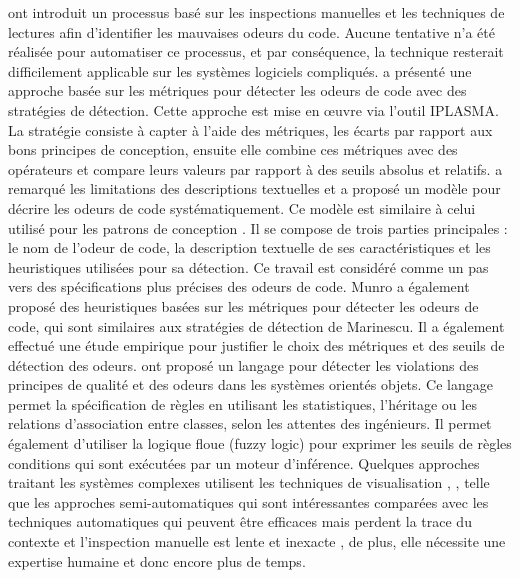 	\cite{travassos1999detecting} ont introduit un processus basé sur les inspections manuelles et les techniques de lectures afin d’identifier les mauvaises odeurs du code. Aucune tentative n'a été réalisée pour automatiser ce processus, et par conséquence, la technique resterait difficilement applicable sur les systèmes logiciels compliqués.
\cite{marinescu2004detection} a présenté une approche basée sur les métriques pour détecter les odeurs de code avec des stratégies de détection. Cette approche est mise en œuvre via l'outil IPLASMA. La stratégie consiste à capter à l'aide des métriques, les écarts par rapport aux bons principes de conception, ensuite elle combine ces métriques avec des opérateurs  et compare leurs valeurs par rapport à des seuils absolus et relatifs.
\cite{munro2005product} a remarqué les limitations des descriptions textuelles et a proposé un modèle pour décrire les odeurs de code systématiquement. Ce modèle est similaire à celui utilisé pour les patrons de conception \cite{vlissides1995design}. Il se compose de trois parties principales : le nom de l'odeur de code, la description textuelle de ses caractéristiques et les heuristiques utilisées pour sa détection.
\newline
Ce travail est considéré comme un pas vers des spécifications plus précises des odeurs de code. Munro a également proposé des heuristiques basées sur les métriques pour détecter les odeurs de code, qui sont similaires aux stratégies de détection de Marinescu. Il a également effectué une étude empirique pour justifier le choix des métriques et des seuils de détection des odeurs.
\newline
\cite{alikacem2009metric} ont proposé un langage pour détecter les violations des principes de qualité et des odeurs dans les systèmes orientés objets. Ce langage permet la spécification de règles en utilisant les statistiques, l'héritage ou les relations d'association entre classes, selon les attentes des ingénieurs. Il permet également d'utiliser la logique floue (fuzzy logic) pour exprimer les seuils de règles conditions qui sont exécutées par un moteur d'inférence. Quelques approches traitant les systèmes complexes utilisent les techniques de visualisation \cite{dhambri2008visual}, \cite{simon2001metrics}, telle que les approches semi-automatiques qui sont intéressantes comparées avec les techniques automatiques qui peuvent être efficaces  mais perdent la trace du contexte et l'inspection manuelle est lente et inexacte \cite{langelier2005visualization}, de plus, elle
nécessite une expertise humaine et donc encore plus de temps. 
